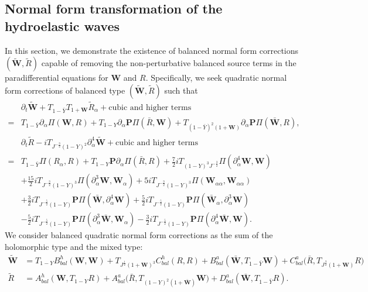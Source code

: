 \documentclass[10pt]{amsart}
\theoremstyle{remark}
\theoremstyle{definition}
\numberwithin{equation}{section}
\newcommand{\p}{\partial}
\newcommand{\al}{\alpha}
\newcommand{\f}{\frac}
\newcommand{\bw}{\mathbf{W}}
\newcommand{\nP}{{\mathbf P}}
\begin{document}
\subsection{Normal form transformation of the hydroelastic waves} \label{s:NormalHydroWaves}
In this section, we demonstrate the existence of balanced normal form corrections $(\tilde{\bw}, \tilde{R})$ capable of removing the non-perturbative balanced source terms in the paradifferential equations for $\bw$ and $R$.
Specifically, we seek quadratic normal form corrections of balanced type $(\tilde{\bw}, \tilde{R})$ such that
 \begin{align*}
&\p_t\tilde{\mathbf{W}} +  T_{1-\bar{Y}}T_{1+\bw} \tilde{R}_\al   + \text{cubic and higher terms}\\
=& T_{1- \bar{Y}}\p_\al \Pi(\bw, R) +T_{1-Y}\partial_\alpha \nP \Pi( \bar{R}, \bw) +T_{(1-\bar{Y})^2(1+\bw)}\partial_\alpha \nP\Pi(\bar{\bw}, R) , \\
&\p_t \tilde{R} -iT_{J^{-\f32}(1-Y)^2}\p^4_{\al}\tilde{\bw}  + \text{cubic and higher terms} \\
=&T_{1-\bar{Y}}\Pi(R_\alpha, R) + T_{1-Y}\nP \p_\al\Pi(\bar{R}, R) +\f72i T_{(1-Y)^3J^{-\f32}}\Pi(\p^4_{\al}\bw,\bw) \\
&+\f{15}{2}iT_{J^{-\f32}(1-Y)^3}\Pi(\p^3_{\al}\bw,\bw_{\al}) +5iT_{J^{-\f32}(1-Y)^3}\Pi(\bw_{\al\al},\bw_{\al\al})\\
&+\f32i T_{J^{-\f52}(1-Y)}\nP\Pi(\bar{\bw}, \p^4_{\al}\bw)+\f52i T_{J^{-\f52}(1-Y)}\nP\Pi(\bar{\bw}_{\al}, \p^3_{\al}\bw)\\
&-\f52i T_{J^{-\f52}(1-Y)}\nP\Pi(\p^3_{\al}\bar{\bw}, \bw_{\al}) -\f32i T_{J^{-\f52}(1-Y)}\nP\Pi(\p^4_{\al}\bar{\bw}, \bw) .
\end{align*}
We consider balanced quadratic normal form corrections as the sum of the holomorphic type and the mixed type:
\begin{align*}
\tilde{\mathbf{W}}   &= T_{1-Y}B^h_{bal}(\bw, \bw) +T_{J^\f12(1+\bw)^3} C^h_{bal}(R, R) + B^a_{bal}(\bar{\bw}, T_{1-\bar{Y}} \bw) + C^a_{bal}\Big(\bar{R}, T_{J^\f32(1+\bw)}R\Big) \\
\tilde{R} &= A^h_{bal}(\bw, T_{1-Y}R)  + A^a_{bal}\Big(\bar{R}, T_{(1-Y)^2(1+\bar{\bw})}\bw\Big) + D^a_{bal}(\bar{\bw}, T_{1-\bar{Y}} R).
\end{align*}
\end{document}
